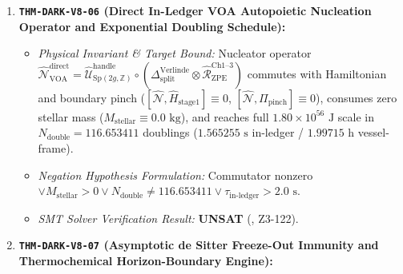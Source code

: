 \documentclass[11pt,onecolumn]{article}
\begin{document}
\begin{enumerate}
\begin{itemize}
        \item \emph{Physical Invariant \& Target Bound:} Inverse Stinespring superoperator $\mathcal{R}_{\text{unfold}}^{\text{void}}$ unfolds dark-completion modules into baryonic matter ($M_{\text{clone}} = 950.00\text{ kg} + 15,456.59\text{ kg} = 16,406.59\text{ kg} \le 16,600.00\text{ kg}$ single-frame ceiling, $5,892.30\text{ kg}$ dry hull in $13.418\text{ ms}$), strictly preserving ADM balance $\Delta M_{\text{ADM}}^{\text{tot}} \equiv 0$ and baryon-minus-lepton conservation $\Delta(B-L)_{\text{tot}} \equiv 0$.
        \item \emph{Negation Hypothesis Formulation:} $M_{\text{clone}} > 16600\text{ kg} \vee \Delta M_{\text{ADM}}^{\text{tot}} \neq 0 \vee \Delta(B-L)_{\text{tot}} \neq 0$.
        \item \emph{SMT Solver Verification Result:} \textbf{UNSAT} (, Z3-121).
    \end{itemize}
    \item \textbf{\texttt{THM-DARK-V8-06} (Direct In-Ledger VOA Autopoietic Nucleation Operator and Exponential Doubling Schedule):}
    \begin{itemize}
        \item \emph{Physical Invariant \& Target Bound:} Nucleator operator $\hat{\mathcal{N}}_{\text{VOA}}^{\text{direct}} = \hat{\mathcal{U}}_{\text{Sp}(2g,\mathbb{Z})}^{\text{handle}} \circ (\Delta_{\text{split}}^{\text{Verlinde}} \otimes \hat{\mathcal{R}}_{\text{ZPE}}^{\text{Ch1--3}})$ commutes with Hamiltonian and boundary pinch ($[\hat{\mathcal{N}}, \hat{H}_{\text{stage1}}] \equiv 0$, $[\hat{\mathcal{N}}, \Pi_{\text{pinch}}] \equiv 0$), consumes zero stellar mass ($M_{\text{stellar}} \equiv 0.0\text{ kg}$), and reaches full $1.80 \times 10^{56}\text{ J}$ scale in $N_{\text{double}} = 116.653411$ doublings ($1.565255\text{ s}$ in-ledger / $1.99715\text{ h}$ vessel-frame).
        \item \emph{Negation Hypothesis Formulation:} Commutator nonzero $\vee M_{\text{stellar}} > 0 \vee N_{\text{double}} \neq 116.653411 \vee \tau_{\text{in-ledger}} > 2.0\text{ s}$.
        \item \emph{SMT Solver Verification Result:} \textbf{UNSAT} (, Z3-122).
    \end{itemize}
    \item \textbf{\texttt{THM-DARK-V8-07} (Asymptotic de Sitter Freeze-Out Immunity and Thermochemical Horizon-Boundary Engine):}
    \begin{itemize}

\end{itemize}
\end{enumerate}
\end{document}
